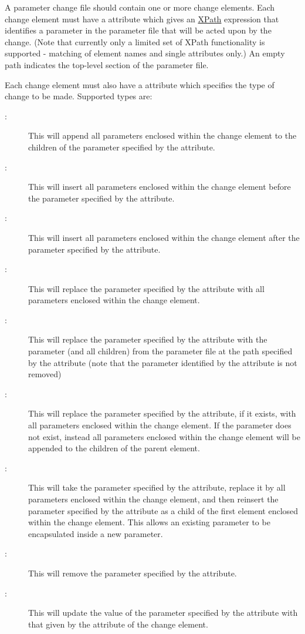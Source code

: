 A parameter change file should contain one or more change elements. Each change element must have a  attribute which gives an \href{http://www.w3schools.com/Xml/xpath_syntax.asp}{XPath} expression that identifies a parameter in the parameter file that will be acted upon by the change. (Note that currently only a limited set of XPath functionality is supported - matching of element names and single attributes only.) An empty path indicates the top-level section of the parameter file.

Each change element must also have a  attribute which specifies the type of change to be made. Supported types are:
\begin{description}
\item[:] This will append all parameters enclosed within the change element to the children of the parameter specified by the  attribute.
\item[:] This will insert all parameters enclosed within the change element before the parameter specified by the  attribute.
\item[:] This will insert all parameters enclosed within the change element after the parameter specified by the  attribute.
\item[:] This will replace the parameter specified by the  attribute with all parameters enclosed within the change element.
\item[:] This will replace the parameter specified by the  attribute with the parameter (and all children) from the parameter file at the path specified by the  attribute (note that the parameter identified by the  attribute is not removed)
\item[:] This will replace the parameter specified by the  attribute, if it exists, with all parameters enclosed within the change element. If the parameter does not exist, instead all parameters enclosed within the change element will be appended to the children of the parent element.
\item[:] This will take the parameter specified by the  attribute, replace it by all parameters enclosed within the change element, and then reinsert the parameter specified by the  attribute as a child of the first element enclosed within the change element. This allows an existing parameter to be encapsulated inside a new parameter.
\item[:] This will remove the parameter specified by the  attribute.
\item[:] This will update the value of the parameter specified by the  attribute with that given by the  attribute of the change element.
\end{description}

